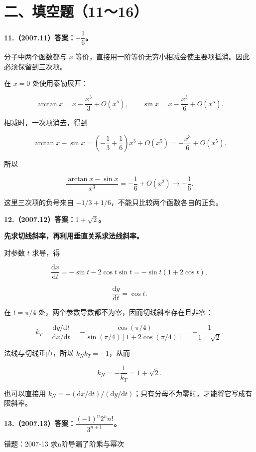 \documentclass[UTF8,11pt,fontset=windows]{ctexart}
\begin{document}
\clearpage

\section*{二、填空题（11～16）}

\textbf{11.（2007.11）答案：$-\dfrac16$。}

分子中两个函数都与 $x$ 等价，直接用一阶等价无穷小相减会使主要项抵消。因此必须保留到三次项。

在 $x=0$ 处使用泰勒展开：

$$
\arctan x=x-\frac{x^3}{3}+O(x^5),
\qquad
\sin x=x-\frac{x^3}{6}+O(x^5).
$$

相减时，一次项消去，得到

$$
\arctan x-\sin x
=\left(-\frac13+\frac16\right)x^3+O(x^5)
=-\frac{x^3}{6}+O(x^5).
$$

所以

$$
\frac{\arctan x-\sin x}{x^3}
=-\frac16+O(x^2)\longrightarrow-\frac16.
$$

这里三次项的负号来自 $-1/3+1/6$，不能只比较两个函数各自的正负。

\clearpage

\textbf{12.（2007.12）答案：$1+\sqrt2$。}

\textbf{先求切线斜率，再利用垂直关系求法线斜率。}

对参数 $t$ 求导，得

$$
\frac{\mathrm dx}{\mathrm dt}
=-\sin t-2\cos t\sin t
=-\sin t(1+2\cos t),
$$

$$
\frac{\mathrm dy}{\mathrm dt}=\cos t.
$$

在 $t=\pi/4$ 处，两个参数导数都不为零，因而切线斜率存在且非零：

$$
k_T=\frac{\mathrm dy/\mathrm dt}{\mathrm dx/\mathrm dt}
=-\frac{\cos(\pi/4)}{\sin(\pi/4)[1+2\cos(\pi/4)]}
=-\frac1{1+\sqrt2}.
$$

法线与切线垂直，所以 $k_Nk_T=-1$，从而

$$
\boxed{k_N=-\frac1{k_T}=1+\sqrt2.}
$$

也可以直接用 $k_N=-(\mathrm dx/\mathrm dt)/(\mathrm dy/\mathrm dt)$；只有分母不为零时，才能将它写成有限斜率。

\clearpage

\textbf{13.（2007.13）答案：$\dfrac{(-1)^n2^n n!}{3^{n+1}}$。}

\begingroup\color{gray}错题：2007-13 求n阶导漏了阶乘与幂次\par\endgroup
\end{document}
